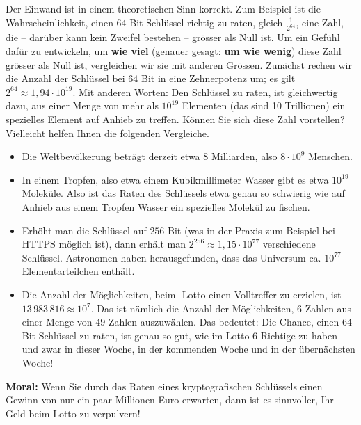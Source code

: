 \begin{fancyquotes}
Der Einwand ist in einem theoretischen Sinn korrekt. Zum Beispiel ist die Wahrscheinlichkeit, einen $64$-Bit-Schlüssel richtig zu raten, gleich $\frac{1}{2^{64}}$, eine Zahl, die -- darüber kann kein Zweifel bestehen -- grösser als Null ist. Um ein Gefühl dafür zu entwickeln, um \textbf{wie viel} (genauer gesagt: \textbf{um wie wenig}) diese Zahl grösser als Null ist, vergleichen wir sie mit anderen Grössen. Zunächst rechen wir die Anzahl der Schlüssel bei $64$ Bit in eine Zehnerpotenz um; es gilt $2^{64} \approx 1,94 \cdot 10^{19}$. Mit anderen Worten: Den Schlüssel zu raten, ist gleichwertig dazu, aus einer Menge von mehr als $10^{19}$ Elementen (das sind 10 Trillionen) ein spezielles Element auf Anhieb zu treffen. Können Sie sich diese Zahl vorstellen? Vielleicht helfen Ihnen die folgenden Vergleiche.

\begin{itemize}
	\item Die Weltbevölkerung beträgt derzeit etwa 8 Milliarden, also $8 \cdot 10^9$ Menschen.
	\item In einem Tropfen, also etwa einem Kubikmillimeter Wasser gibt es etwa $10^{19}$ Moleküle. Also ist das Raten des Schlüssels etwa genau so schwierig wie auf Anhieb aus einem Tropfen Wasser ein spezielles Molekül zu fischen.
	\item Erhöht man die Schlüssel auf $256$ Bit (was in der Praxis zum Beispiel bei \ac{HTTPS} möglich ist), dann erhält man $2^{256} \approx 1,15 \cdot 10^{77}$ verschiedene Schlüssel. Astronomen haben herausgefunden, dass das Universum  ca. $10^{77}$ Elementarteilchen enthält.
	\item Die Anzahl der Möglichkeiten, beim -Lotto einen Volltreffer zu erzielen, ist $13\,983\,816 \approx 10^7$. Das ist nämlich die Anzahl der Möglichkeiten, $6$ Zahlen aus einer Menge von $49$ Zahlen auszuwählen. Das bedeutet: Die Chance, einen $64$-Bit-Schlüssel zu raten, ist genau so gut, wie im Lotto $6$ Richtige zu haben -- und zwar in dieser Woche, in der kommenden Woche und in der übernächsten Woche!
\end{itemize}

\textbf{Moral:} Wenn Sie durch das Raten eines kryptografischen Schlüssels einen Gewinn von nur ein paar Millionen Euro erwarten, dann ist es sinnvoller, Ihr Geld beim Lotto zu verpulvern!

\end{fancyquotes}

\newpage

